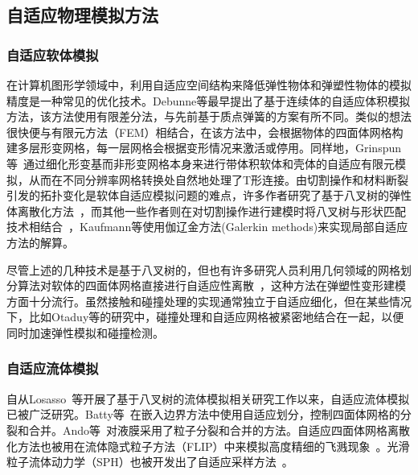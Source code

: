 \subsection{自适应物理模拟方法}
\subsubsection{自适应软体模拟}
在计算机图形学领域中，利用自适应空间结构来降低弹性物体和弹塑性物体的模拟精度是一种常见的优化技术。Debunne等\cite{debunne1999interactive}最早提出了基于连续体的自适应体积模拟方法，该方法使用有限差分法，与先前基于质点弹簧的方案有所不同。类似的想法很快便与有限元方法（FEM）相结合\cite{capell2002multiresolution}，在该方法中，会根据物体的四面体网格构建多层形变网格，每一层网格会根据变形情况来激活或停用。同样地，Grinspun等~\cite{grinspun2002charms}通过细化形变基而非形变网格本身来进行带体积软体和壳体的自适应有限元模拟，从而在不同分辨率网格转换处自然地处理了T形连接。由切割操作和材料断裂引发的拓扑变化是软体自适应模拟问题的难点，许多作者研究了基于八叉树的弹性体离散化方法~\cite{seiler2011robust}，而其他一些作者则在对切割操作进行建模时将八叉树与形状匹配技术相结合~\cite{steinemann2008fast}，Kaufmann等使用伽辽金方法(Galerkin methods)来实现局部自适应方法的解算。

尽管上述的几种技术是基于八叉树的，但也有许多研究人员利用几何领域的网格划分算法对软体的四面体网格直接进行自适应性离散~\cite{labelle2007isosurface}，这种方法在弹塑性变形建模方面十分流行\cite{wicke2010dynamic}。虽然接触和碰撞处理的实现通常独立于自适应细化，但在某些情况下，比如Otaduy等\cite{otaduy2007adaptive}的研究中，碰撞处理和自适应网格被紧密地结合在一起，以便同时加速弹性模拟和碰撞检测。

\subsubsection{自适应流体模拟}
自从Losasso~\cite{losasso2004simulating}等开展了基于八叉树的流体模拟相关研究工作以来，自适应流体模拟已被广泛研究。Batty等~\cite{batty2010tetrahedral}在嵌入边界方法中使用自适应划分，控制四面体网格的分裂和合并。Ando等~\cite{ando2012preserving}对液膜采用了粒子分裂和合并的方法。自适应四面体网格离散化方法也被用在流体隐式粒子方法（FLIP）中来模拟高度精细的飞溅现象~\cite{ando2013highly}。光滑粒子流体动力学（SPH）也被开发出了自适应采样方法~\cite{adams2007adaptively, solenthaler2011two}。

